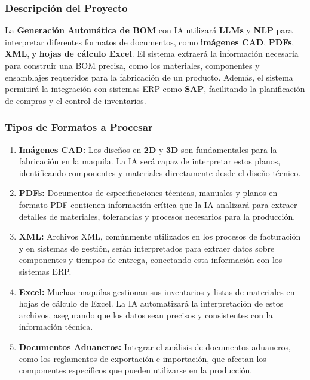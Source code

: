 \documentclass[
  10pt,
  letterpaper,
]{book}
\begin{document}
\subsubsection{Descripción del
Proyecto}\label{descripciuxf3n-del-proyecto}

La \textbf{Generación Automática de BOM} con IA utilizará \textbf{LLMs}
y \textbf{NLP} para interpretar diferentes formatos de documentos, como
\textbf{imágenes CAD}, \textbf{PDFs}, \textbf{XML}, y \textbf{hojas de
cálculo Excel}. El sistema extraerá la información necesaria para
construir una BOM precisa, como los materiales, componentes y
ensamblajes requeridos para la fabricación de un producto. Además, el
sistema permitirá la integración con sistemas ERP como \textbf{SAP},
facilitando la planificación de compras y el control de inventarios.

\subsubsection{Tipos de Formatos a
Procesar}\label{tipos-de-formatos-a-procesar}

\begin{enumerate}
\def\labelenumi{\arabic{enumi}.}
\item
  \textbf{Imágenes CAD:} Los diseños en \textbf{2D} y \textbf{3D} son
  fundamentales para la fabricación en la maquila. La IA será capaz de
  interpretar estos planos, identificando componentes y materiales
  directamente desde el diseño técnico.
\item
  \textbf{PDFs:} Documentos de especificaciones técnicas, manuales y
  planos en formato PDF contienen información crítica que la IA
  analizará para extraer detalles de materiales, tolerancias y procesos
  necesarios para la producción.
\item
  \textbf{XML:} Archivos XML, comúnmente utilizados en los procesos de
  facturación y en sistemas de gestión, serán interpretados para extraer
  datos sobre componentes y tiempos de entrega, conectando esta
  información con los sistemas ERP.
\item
  \textbf{Excel:} Muchas maquilas gestionan sus inventarios y listas de
  materiales en hojas de cálculo de Excel. La IA automatizará la
  interpretación de estos archivos, asegurando que los datos sean
  precisos y consistentes con la información técnica.
\item
  \textbf{Documentos Aduaneros:} Integrar el análisis de documentos
  aduaneros, como los reglamentos de exportación e importación, que
  afectan los componentes específicos que pueden utilizarse en la
  producción.
\end{enumerate}
\end{document}

